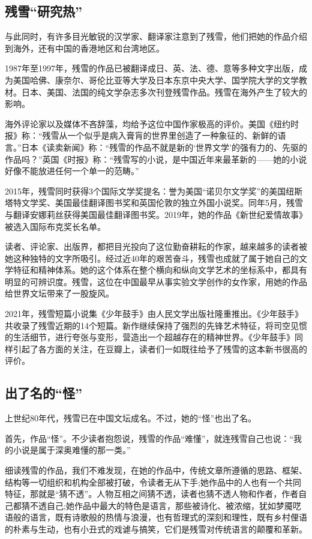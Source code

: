 \documentclass[fontset=fandol,12pt,a5paper]{ctexbook}
\begin{document}
\subsection{残雪“研究热”}
与此同时，有许多目光敏锐的汉学家、翻译家注意到了残雪，他们把她的作品介绍到海外，还有中国的香港地区和台湾地区。

1987年至1997年，残雪的作品已被翻译成日、英、法、德、意等多种文字出版，成为美国哈佛、康奈尔、哥伦比亚等大学及日本东京中央大学、国学院大学的文学教材。日本、美国、法国的纯文学杂志多次刊登残雪作品。残雪在海外产生了较大的影响。

海外评论家以及媒体不吝辞藻，均给予这位中国作家极高的评价。美国《纽约时报》称：“残雪从一个似乎是病入膏肓的世界里创造了一种象征的、新鲜的语言。”日本《读卖新闻》称：“残雪的作品不就是新的‘世界文学’的强有力的、先驱的作品吗？”英国《时报》称：“残雪写的小说，是中国近年来最革新的——她的小说好像不能放进任何一个单一的范畴。”

2015年，残雪同时获得3个国际文学奖提名：誉为美国“诺贝尔文学奖”的美国纽斯塔特文学奖、美国最佳翻译图书奖和英国伦敦的独立外国小说奖。同年5月，残雪与翻译安娜莉丝获得美国最佳翻译图书奖。2019年，她的作品《新世纪爱情故事》被选入国际布克奖长名单。

读者、评论家、出版界，都把目光投向了这位勤奋耕耘的作家，越来越多的读者被她这种独特的文字所吸引。经过近40年的艰苦奋斗，残雪也成就了属于她自己的文学特征和精神体系。她的这个体系在整个横向和纵向文学艺术的坐标系中，都具有明显的可辨识度。残雪，这位在中国最早从事实验文学创作的女作家，用她的作品给世界文坛带来了一股旋风。

2021年，残雪短篇小说集《少年鼓手》由人民文学出版社隆重推出。《少年鼓手》共收录了残雪近期的14个短篇。新作继续保持了强烈的先锋艺术特征，将司空见惯的生活细节，进行夸张与变形，营造出一个超越存在的精神世界。《少年鼓手》同样引起了各方面的关注，在豆瓣上，读者们一如既往给予了残雪的这本新书很高的评价。

\subsection{出了名的“怪”}
上世纪80年代，残雪已在中国文坛成名。不过，她的“怪”也出了名。

首先，作品“怪”。不少读者抱怨说，残雪的作品“难懂”，就连残雪自己也说：“我的小说是属于深奥难懂的那一类。”

细读残雪的作品，我们不难发现，在她的作品中，传统文章所遵循的思路、框架、结构等一切组织和机构全部被打破，令读者无从下手;她作品中的人也有一个共同特征，那就是“猜不透”。人物互相之间猜不透，读者也猜不透人物和作者，作者自己都猜不透自己;她作品中最大的特色是语言，那些被诗化、被浓缩，犹如梦魇呓语般的语言，既有诗歌般的热情与浪漫，也有哲理式的深刻和理性，既有乡村俚语的朴素与生动，也有小丑式的戏谑与搞笑，它们是残雪对传统语言的颠覆和革新。
\end{document}
